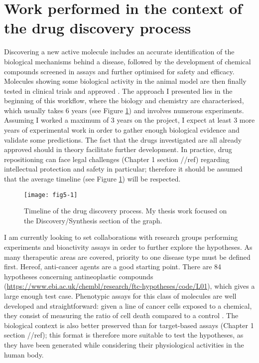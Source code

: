 \section{Work performed in the context of the drug discovery process}
Discovering a new active molecule includes an accurate identification of the biological mechanisms behind a disease, followed by the development of chemical compounds screened in assays and further optimised for safety and efficacy. Molecules showing some biological activity in the animal model are then finally tested in clinical trials and approved \citep{fishman2005pharmaceuticals} \citep{cooper2002optical}. The approach I presented lies in the beginning of this workflow, where the biology and chemistry are characterised, which usually takes 6 years (see Figure \ref{fig5-1}) and involves numerous experiments. Assuming I worked a maximum of 3 years on the project, I expect at least 3 more years of experimental work in order to gather enough biological evidence and validate some predictions.  The fact that the drugs investigated are all already approved should in theory facilitate further development. In practice, drug repositioning can face legal challenges (Chapter 1 section //ref) regarding intellectual protection and safety in particular; therefore it should be assumed that the average timeline (see Figure \ref{fig5-1}) will be respected.

\begin{figure}[ht]
    \centering
    \texttt{[image: fig5-1]}
    \caption{Timeline of the drug discovery process. My thesis work focused on the Discovery/Synthesis section of the graph.}
    \label{fig5-1}
\end{figure}

I am currently looking to set collaborations with research groups performing experiments and bioactivity assays in order to further explore the hypotheses. As many therapeutic areas are covered, priority to one disease type must be defined first. Hereof, anti-cancer agents are a good starting point. There are 84 hypotheses concerning antineoplastic compounds (\url{https://www.ebi.ac.uk/chembl/research/ftc-hypotheses/code/L01}), which gives a large enough test case. Phenotypic assays for this class of molecules are well developed and straightforward: given a line of cancer cells exposed to a chemical, they consist of measuring the ratio of cell death compared to a control \citep{garnett2012systematic}. The biological context is also better preserved than for target-based assays (Chapter 1 section //ref); this format is therefore more suitable to test the hypotheses, as they have been generated while considering their physiological activities in the human body.

